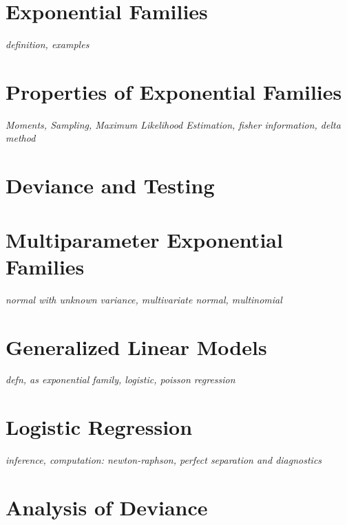 \documentclass[../../../main.tex]{subfiles}
\begin{document}

\section{Exponential Families}
\textit{definition, examples}

\section{Properties of Exponential Families}
\textit{Moments, Sampling, Maximum Likelihood Estimation, fisher information, delta method}

\section{Deviance and Testing}

\section{Multiparameter Exponential Families}
\textit{normal with unknown variance, multivariate normal, multinomial}

\section{Generalized Linear Models}
\textit{defn, as exponential family, logistic, poisson regression}

\section{Logistic Regression}
\textit{inference, computation: newton-raphson, perfect separation and diagnostics}

\section{Analysis of Deviance}

\printbibliography[
    heading=subbibintoc,
    title={References}
]
\end{document}
